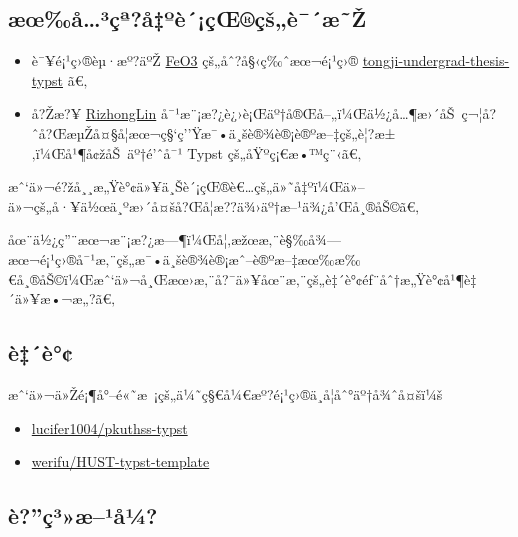 \subsection{æœ‰å\ldots³çª?å‡ºè´¡çŒ®çš„è¯´æ˜Ž}\label{uxe6ux153uxe5uxb3uxe7uxaauxe5uxbauxe8uxe7ux153uxe7ux161uxe8uxe6ux17e}

\begin{itemize}
\tightlist
\item
  è¯¥é¡¹ç›®èµ·æº?äºŽ \href{https://github.com/seashell11234455}{FeO3}
  çš„åˆ?å§‹ç‰ˆæœ¬é¡¹ç›®
  \href{https://github.com/TJ-CSCCG/tongji-undergrad-thesis-typst/tree/lky}{tongji-undergrad-thesis-typst}
  ã€‚
\item
  å?Žæ?¥ \href{https://github.com/RizhongLin}{RizhongLin}
  å¯¹æ¨¡æ?¿è¿›è¡Œäº†å®Œå--„ï¼Œä½¿å\ldots¶æ›´åŠ~ç¬¦å?ˆå?ŒæµŽå¤§å­¦æœ¬ç§`ç''Ÿæ¯•ä¸šè®¾è®¡è®ºæ--‡çš„è¦?æ±‚ï¼Œå¹¶å¢žåŠ~äº†é'ˆå¯¹
  Typst çš„åŸºç¡€æ•™ç¨‹ã€‚
\end{itemize}

æˆ`ä»¬é?žå¸¸æ„Ÿè°¢ä»¥ä¸Šè´¡çŒ®è€\ldots çš„ä»˜å‡ºï¼Œä»--ä»¬çš„å·¥ä½œä¸ºæ›´å¤šå?Œå­¦æ??ä¾›äº†æ--¹ä¾¿å'Œå¸®åŠ©ã€‚

åœ¨ä½¿ç''¨æœ¬æ¨¡æ?¿æ---¶ï¼Œå¦‚æžœæ‚¨è§‰å¾---æœ¬é¡¹ç›®å¯¹æ‚¨çš„æ¯•ä¸šè®¾è®¡æˆ--è®ºæ--‡æœ‰æ‰€å¸®åŠ©ï¼Œæˆ`ä»¬å¸Œæœ›æ‚¨å?¯ä»¥åœ¨æ‚¨çš„è‡´è°¢éƒ¨åˆ†æ„Ÿè°¢å¹¶è‡´ä»¥æ•¬æ„?ã€‚

\subsection{è‡´è°¢}\label{uxe8uxe8}

æˆ`ä»¬ä»Žé¡¶å°--é«˜æ~¡çš„ä¼˜ç§€å¼€æº?é¡¹ç›®ä¸­å­¦åˆ°äº†å¾ˆå¤šï¼š

\begin{itemize}
\tightlist
\item
  \href{https://github.com/lucifer1004/pkuthss-typst}{lucifer1004/pkuthss-typst}
\item
  \href{https://github.com/werifu/HUST-typst-template}{werifu/HUST-typst-template}
\end{itemize}

\subsection{è?''ç³»æ--¹å¼?}\label{uxe8uxe7uxb3uxe6uxb9uxe5uxbc}

\begin{Shaded}
\begin{Highlighting}[]
\NormalTok{[}
    \StringTok{\textquotesingle{}$\textquotesingle{}}\NormalTok{, }\StringTok{\textquotesingle{}\%\textquotesingle{}}\NormalTok{, }\NormalTok{),}
\NormalTok{]}
\end{Highlighting}
\end{Shaded}

